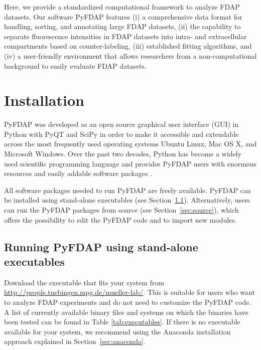 \documentclass[a4paper,11pt]{article}
\begin{document}
Here, we provide a standardized computational framework to analyze FDAP datasets. Our software PyFDAP features (i) a comprehensive data format for handling, sorting, and annotating large FDAP datasets, (ii) the capability to separate fluorescence intensities in FDAP datasets into intra- and extracellular compartments based on counter-labeling, (iii) established fitting algorithms, and (iv) a user-friendly environment that allows researchers from a non-computational background to easily evaluate FDAP datasets.

\section{Installation}

PyFDAP was developed as an open source graphical user interface (GUI) in Python with PyQT and SciPy in order to make it accessible and extendable across the most frequently used operating systems Ubuntu Linux, Mac OS X, and Microsoft Windows. Over the past two decades, Python has become a widely used scientific programming language and provides PyFDAP users with enormous resources and easily addable software packages \citep{Millman2011}. 

All software packages needed to run PyFDAP are freely available. PyFDAP can be installed using stand-alone executables (see Section~\ref{sec:executable}). Alternatively, users can run the PyFDAP packages from source (see Section~\ref{sec:source}), which offers the possibility to edit the PyFDAP code and to import new modules.

\subsection{Running PyFDAP using stand-alone executables}
\label{sec:executable}
Download the executable that fits your system from \href{http://people.tuebingen.mpg.de/mueller-lab/}{http://people.tuebingen.mpg.de/mueller-lab/}. This is suitable for users who want to analyze FDAP experiments and do not need to customize the PyFDAP code. A list of currently available binary files and systems on which the binaries have been tested can be found in Table \ref{tab:executables}. If there is no executable available for your system, we recommend using the Anaconda installation approach explained in Section~\ref{sec:anaconda}.
 
\end{document}
